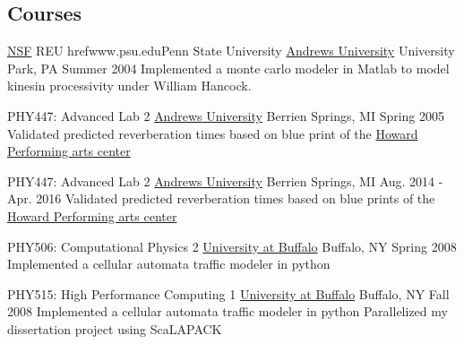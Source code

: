 

\begin{cventries}
  

\subsection{Courses}

  \cventry
    {\href{www.nsf.gov}{NSF} REU}
    {href{www.psu.edu}{Penn State University}}
    {\href{www.andrews.edu}{Andrews University}}
    {University Park, PA}
    {Summer 2004}
    {Implemented a monte carlo modeler in Matlab to model kinesin processivity under William Hancock.}

  \cventry
    {PHY447: Advanced Lab 2} %
    {\href{www.andrews.edu}{Andrews University}}
    {Berrien Springs, MI} %
    {Spring 2005} %
    {Validated predicted reverberation times based on blue print of the \href{howard.andrews.edu}{Howard Performing arts center}}



  \cventry
    {PHY447: Advanced Lab 2}
    {\href{www.andrews.edu}{Andrews University}}
    {Berrien Springs, MI}
    {Aug. 2014 - Apr. 2016}
    {Validated predicted reverberation times based on blue prints of the \href{howard.andrews.edu}{Howard Performing arts center}}

  \cventry
    {PHY506: Computational Physics 2}
    {\href{www.buffalo.edu}{University at Buffalo}}
    {Buffalo, NY}
    {Spring 2008}
    {Implemented a cellular automata traffic modeler in python}

  \cventry
	{PHY515: High Performance Computing 1}
    {\href{www.buffalo.edu}{University at Buffalo}}
    {Buffalo, NY}
    {Fall 2008}
    {Implemented a cellular automata traffic modeler in python}
    {Parallelized my dissertation project using ScaLAPACK}


\end{cventries}
